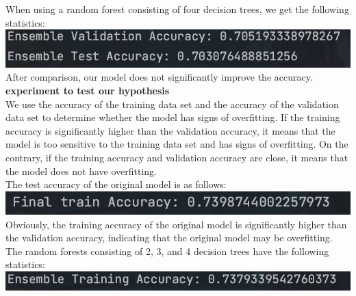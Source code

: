 \documentclass{article}
\begin{document}
\begin{enumerate}
    When using a random forest consisting of four decision trees, we get the following statistics: \vspace{10}\\
    \includegraphics[width=0.7\linewidth]{6121723196137_.pic.jpg} \vspace{10}\\
        
    After comparison, our model does not significantly improve the accuracy. \vspace{20}\\
    \textbf{experiment to test our hypothesis} \vspace{20}\\
    We use the accuracy of the training data set and the accuracy of the validation data set to determine whether the model has signs of overfitting. If the training accuracy is significantly higher than the validation accuracy, it means that the model is too sensitive to the training data set and has signs of overfitting. On the contrary, if the training accuracy and validation accuracy are close, it means that the model does not have overfitting. \vspace{10}\\
    The test accuracy of the original model is as follows: \vspace{10}\\
    \includegraphics[width=0.7\linewidth]{6071723195572_.pic.jpg} \vspace{10}\\
    Obviously, the training accuracy of the original model is significantly higher than the validation accuracy, indicating that the original model may be overfitting. \vspace{20}\\
    The random forests consisting of 2, 3, and 4 decision trees have the following statistics:\vspace{10} \\
    \includegraphics[width=0.7\linewidth]{6091723195756_.pic.jpg} \vspace{10}\\

\end{enumerate}
\end{document}
